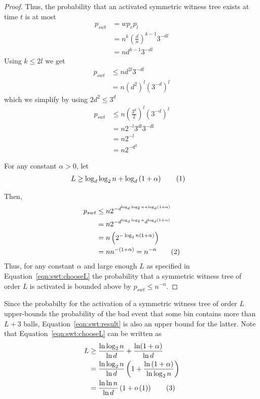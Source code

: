 \documentclass[a4paper,12pt]{article}
\newcommand\numberthis{\addtocounter{equation}{1}\tag{\theequation}}
\newcommand\neqn[1]{\numberthis\label{eqn:#1}}
\begin{document}
\begin{proof}
Thus, the probability that an activated symmetric witness tree exists at time $t$ is at most 
\begin{align*}
p_{swt} &= w  p_e  p_l \\
		&= n^{k}  \left(\frac{d}{n}\right)^{k-1}  3^{-d  l} \\
		&= n  d^{k-1}  3^{-d  l}
\end{align*}
Using $k \leq 2l$ we get
\begin{align*}
p_{swt} &\leq n  d^{2 l}  3^{-d  l} \\
		&= n  \left(d^2\right)^l  \left( 3^{-d} \right)^l
\end{align*}
which we simplify by using $2d^2 \leq 3^d$
\begin{align*}
p_{swt} &\leq n  \left(\frac{3^d}{2}\right)^l  \left( 3^{-d}\right)^l \\
		&= n  2^{-l}  3^{d l}  3^{-d  l} \\
		&= n 2^{-l}		\\
		&= n 2^{-d^L}		
\end{align*}

For any constant $\alpha > 0 $, let
\begin{align*}
L &\geq \log_d\log_2 n + \log_d\left(1+\alpha\right) \neqn{swt:chooseL}
\end{align*}

Then, 
\begin{align*}
p_{swt} &\leq n  2^{{-d}^{\log_d\log_2 n + \log_d\left(1+\alpha\right)}} \\
		&= n  2^{-{d}^{\log_d\log_2 n} d^{\log_d \left(1+\alpha\right)}} \\
		&= n  \left( 2^{-\log_2 n  \left(1+ \alpha \right)} \right) \\
		&= n  n^{-\left(1+\alpha\right)} = n^{-\alpha} \neqn{swt:result}
\end{align*}
Thus, for any constant $\alpha$ and large enough $L$ as specified in Equation~\ref{eqn:swt:chooseL} the probability that a symmetric witness tree of order $L$ is activated is bounded above by $p_{swt }\leq n^{-\alpha}$.
\end{proof}

Since the probabilty for the activation of a symmetric witness tree of order $L$ upper-bounds the probability of the bad event that some bin contains more than $L+3$ balls, Equation~\ref{eqn:swt:result} is also an upper bound for the latter. Note that Equation~\ref{eqn:swt:chooseL} can be written as
\begin{align*}
L &\geq  \frac{\ln\log_2 n}{\ln d} + \frac{\ln(1+\alpha)}{\ln d} \\
   &= \frac{\ln \log_2 n}{\ln d}  \left(1 + \frac{\ln\left(1+\alpha\right)}{\ln \log_2 n}\right) \\
  &=  \frac{\ln \ln n}{\ln d}  \left( 1+ o\left( 1\right)\right) \neqn{swt:boundL}
\end{align*}
\end{document}
